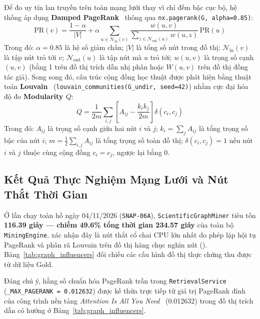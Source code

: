 Để đo uy tín lan truyền trên toàn mạng lưới thay vì chỉ đếm bậc cục bộ, hệ thống áp dụng \textbf{Damped PageRank}~\cite{page1999pagerank} thông qua \texttt{nx.pagerank(G, alpha=0.85)}:
\begin{equation}
  \mathrm{PR}(v) = \frac{1 - \alpha}{|V|} + \alpha \sum_{u \in \mathcal{N}_{\text{in}}(v)} \frac{w(u, v)}{\sum_{z \in \mathcal{N}_{\text{out}}(u)} w(u, z)} \, \mathrm{PR}(u)
  \label{eq:ch4_pagerank}
\end{equation}
Trong đó: $\alpha = 0.85$ là hệ số giảm chấn; $|V|$ là tổng số nút trong đồ thị; $\mathcal{N}_{\text{in}}(v)$ là tập nút trỏ tới $v$; $\mathcal{N}_{\text{out}}(u)$ là tập nút mà $u$ trỏ tới; $w(u, v)$ là trọng số cạnh $(u, v)$ (bằng 1 trên đồ thị trích dẫn nhị phân hoặc $W(u, v)$ trên đồ thị đồng tác giả). Song song đó, cấu trúc cộng đồng học thuật được phát hiện bằng thuật toán \textbf{Louvain}~\cite{blondel2008fast} (\texttt{louvain\_communities(G\_undir, seed=42)}) nhằm cực đại hóa độ đo \textbf{Modularity $Q$}:
\begin{equation}
  Q = \frac{1}{2m} \sum_{i, j} \left[ A_{ij} - \frac{k_i k_j}{2m} \right] \delta(c_i, c_j)
  \label{eq:ch4_louvain}
\end{equation}
Trong đó: $A_{ij}$ là trọng số cạnh giữa hai nút $i$ và $j$; $k_i = \sum_j A_{ij}$ là tổng trọng số bậc của nút $i$; $m = \frac{1}{2}\sum_{i,j} A_{ij}$ là tổng trọng số toàn đồ thị; $\delta(c_i, c_j) = 1$ nếu nút $i$ và $j$ thuộc cùng cộng đồng $c_i = c_j$, ngược lại bằng $0$.

\subsection{Kết Quả Thực Nghiệm Mạng Lưới và Nút Thắt Thời Gian}
\label{sec:ch4_graph_results}

Ở lần chạy toàn hồ ngày 04/11/2026 (\texttt{SNAP-06A}), \texttt{ScientificGraphMiner} tiêu tốn \textbf{116.39 giây --- chiếm 49.6\% tổng thời gian 234.57 giây} của toàn bộ \texttt{MiningEngine}, xác nhận đây là nút thắt cổ chai CPU lớn nhất do phép lặp hội tụ PageRank và phân rã Louvain trên đồ thị hàng chục nghìn nút (). Bảng~\ref{tab:graph_influencers} đối chiếu các cấu hình đồ thị thực chứng thu được từ dữ liệu Gold.



Đáng chú ý, hằng số chuẩn hóa PageRank trần trong \texttt{RetrievalService} (\texttt{\_MAX\_PAGERANK = 0.012632}) được kế thừa trực tiếp từ giá trị PageRank đỉnh của công trình nền tảng \textit{Attention Is All You Need}~\cite{vaswani2017attention} (0.012632) trong đồ thị trích dẫn có hướng ở Bảng~\ref{tab:graph_influencers}.

